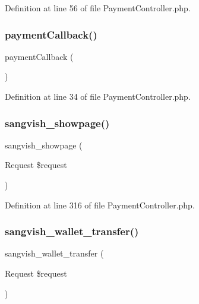 Definition at line 56 of file Payment\+Controller.\+php.

\mbox{\label{class_responsive_1_1_http_1_1_controllers_1_1_payment_controller_a4fde5ff369bdee0aec91a53db06bc0cc}} 
\subsubsection{\texorpdfstring{paymentCallback()}{paymentCallback()}}
{\footnotesize\ttfamily payment\+Callback (\begin{DoxyParamCaption}{ }\end{DoxyParamCaption})}



Definition at line 34 of file Payment\+Controller.\+php.

\mbox{\label{class_responsive_1_1_http_1_1_controllers_1_1_payment_controller_ad3a43cf2cd7cf969c7972fcea3aa90df}} 
\subsubsection{\texorpdfstring{sangvish\_showpage()}{sangvish\_showpage()}}
{\footnotesize\ttfamily sangvish\+\_\+showpage (\begin{DoxyParamCaption}\item[{Request}]{\$request }\end{DoxyParamCaption})}



Definition at line 316 of file Payment\+Controller.\+php.

\mbox{\label{class_responsive_1_1_http_1_1_controllers_1_1_payment_controller_acfb498a2a1c24de1fd6bfb9fabf2ffad}} 
\subsubsection{\texorpdfstring{sangvish\_wallet\_transfer()}{sangvish\_wallet\_transfer()}}
{\footnotesize\ttfamily sangvish\+\_\+wallet\+\_\+transfer (\begin{DoxyParamCaption}\item[{Request}]{\$request }\end{DoxyParamCaption})}



